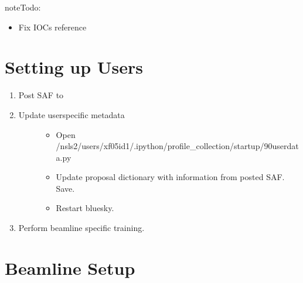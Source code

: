 \documentclass[letterpaper,10pt,english]{sphinxmanual}
\begin{document}
\begin{sphinxadmonition}{note}{\label{\detokenize{staff:id1}}Todo:}\begin{itemize}
\item {} 
\sphinxAtStartPar
Fix IOCs reference

\end{itemize}
\end{sphinxadmonition}


\section{Setting up Users}
\label{\detokenize{staff:setting-up-users}}\begin{enumerate}
%
\item {} 
\sphinxAtStartPar
Post SAF to 

\item {} \begin{description}
\item[{Update user\sphinxhyphen{}specific metadata}] \leavevmode\begin{itemize}
\item {} 
\sphinxAtStartPar
Open /nsls2/users/xf05id1/.ipython/profile\_collection/startup/90\sphinxhyphen{}userdata.py

\item {} 
\sphinxAtStartPar
Update proposal dictionary with information from posted SAF. Save.

\item {} 
\sphinxAtStartPar
Restart bluesky.

\end{itemize}

\end{description}

\item {} 
\sphinxAtStartPar
Perform beamline specific training. 

\end{enumerate}


\section{Beamline Setup}
\label{\detokenize{staff:beamline-setup}}
\sphinxAtStartPar
{}
\end{document}
